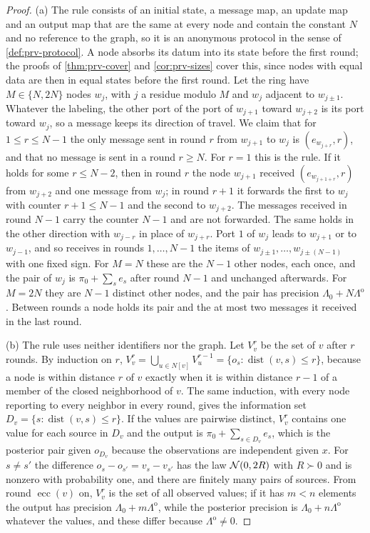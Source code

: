 \begin{proof}
(a) The rule consists of an initial state, a message map, an update map and an output map that are the same at every node and contain the constant $N$ and no reference to the graph, so it is an anonymous protocol in the sense of \cref{def:prv-protocol}. A node absorbs its datum into its state before the first round; the proofs of \cref{thm:prv-cover} and \cref{cor:prv-sizes} cover this, since nodes with equal data are then in equal states before the first round. Let the ring have $M\in\{N,2N\}$ nodes $w_j$, with $j$ a residue modulo $M$ and $w_j$ adjacent to $w_{j\pm1}$. Whatever the labeling, the other port of the port of $w_{j+1}$ toward $w_{j+2}$ is its port toward $w_j$, so a message keeps its direction of travel. We claim that for $1\le r\le N-1$ the only message sent in round $r$ from $w_{j+1}$ to $w_j$ is $(e_{w_{j+r}},r)$, and that no message is sent in a round $r\ge N$. For $r=1$ this is the rule. If it holds for some $r\le N-2$, then in round $r$ the node $w_{j+1}$ received $(e_{w_{j+1+r}},r)$ from $w_{j+2}$ and one message from $w_j$; in round $r+1$ it forwards the first to $w_j$ with counter $r+1\le N-1$ and the second to $w_{j+2}$. The messages received in round $N-1$ carry the counter $N-1$ and are not forwarded. The same holds in the other direction with $w_{j-r}$ in place of $w_{j+r}$. Port $1$ of $w_j$ leads to $w_{j+1}$ or to $w_{j-1}$, and so receives in rounds $1,\dots,N-1$ the items of $w_{j\pm1},\dots,w_{j\pm(N-1)}$ with one fixed sign. For $M=N$ these are the $N-1$ other nodes, each once, and the pair of $w_j$ is $\pi_0+\sum_se_s$ after round $N-1$ and unchanged afterwards. For $M=2N$ they are $N-1$ distinct other nodes, and the pair has precision $\Lambda_0+N\Lambda^{\mathrm o}$. Between rounds a node holds its pair and the at most two messages it received in the last round.

(b) The rule uses neither identifiers nor the graph. Let $V_v^r$ be the set of $v$ after $r$ rounds. By induction on $r$, $V_v^r=\bigcup_{u\in N[v]}V_u^{r-1}=\{o_s:\operatorname{dist}(v,s)\le r\}$, because a node is within distance $r$ of $v$ exactly when it is within distance $r-1$ of a member of the closed neighborhood of $v$. The same induction, with every node reporting to every neighbor in every round, gives the information set $D_v=\{s:\operatorname{dist}(v,s)\le r\}$. If the values are pairwise distinct, $V_v^r$ contains one value for each source in $D_v$ and the output is $\pi_0+\sum_{s\in D_v}e_s$, which is the posterior pair given $o_{D_v}$ because the observations are independent given $x$. For $s\ne s'$ the difference $o_s-o_{s'}=v_s-v_{s'}$ has the law $\mathcal{N}(0,2R)$ with $R\succ0$ and is nonzero with probability one, and there are finitely many pairs of sources. From round $\operatorname{ecc}(v)$ on, $V_v^r$ is the set of all observed values; if it has $m<n$ elements the output has precision $\Lambda_0+m\Lambda^{\mathrm o}$, while the posterior precision is $\Lambda_0+n\Lambda^{\mathrm o}$ whatever the values, and these differ because $\Lambda^{\mathrm o}\ne0$.


\end{proof}
